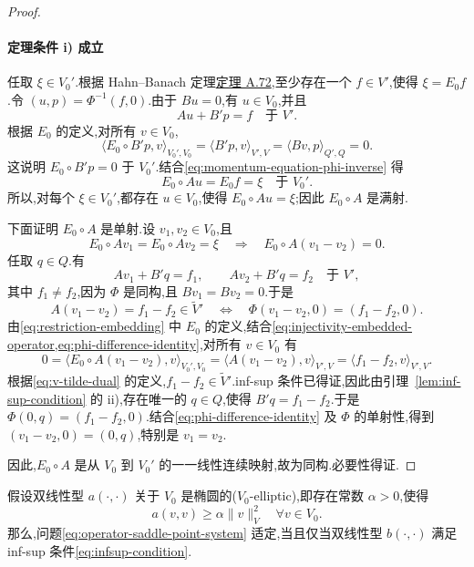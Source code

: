 \begin{proof}
\paragraph{定理条件 i) 成立}
任取 $\xi\in V_0'$.根据 Hahn--Banach 定理\hyperref[thm:appendix-a-72]{定理 A.72},至少存在一个 $f\in V'$,使得 $\xi=E_0f$.令 $(u,p)=\Phi^{-1}(f,0)$.由于 $Bu=0$,有 $u\in V_0$,并且
\begin{equation}\label{eq:momentum-equation-phi-inverse}
  Au+B'p=f\quad\text{于 }V'.
\end{equation}
根据 $E_0$ 的定义,对所有 $v\in V_0$,
\[
  \langle E_0\circ B'p,v\rangle_{V_0',V_0}
    =\langle B'p,v\rangle_{V',V}
    =\langle Bv,p\rangle_{Q',Q}=0.
\]
这说明 $E_0\circ B'p=0$ 于 $V_0'$.结合\cref{eq:momentum-equation-phi-inverse} 得
\[
  E_0\circ Au=E_0f=\xi\quad\text{于 }V_0'.
\]
所以,对每个 $\xi\in V_0'$,都存在 $u\in V_0$,使得 $E_0\circ Au=\xi$;因此 $E_0\circ A$ 是满射.

下面证明 $E_0\circ A$ 是单射.设 $v_1,v_2\in V_0$,且
\begin{equation}\label{eq:injectivity-embedded-operator}
  E_0\circ Av_1=E_0\circ Av_2=\xi
  \quad\Longrightarrow\quad
  E_0\circ A(v_1-v_2)=0.
\end{equation}
任取 $q\in Q$.有
\[
  Av_1+B'q=f_1,\qquad Av_2+B'q=f_2\quad\text{于 }V',
\]
其中 $f_1\ne f_2$,因为 $\Phi$ 是同构,且 $Bv_1=Bv_2=0$.于是
\begin{equation}\label{eq:phi-difference-identity}
  A(v_1-v_2)=f_1-f_2\in\widetilde{V}'
  \quad\Longleftrightarrow\quad
  \Phi(v_1-v_2,0)=(f_1-f_2,0).
\end{equation}
由\cref{eq:restriction-embedding} 中 $E_0$ 的定义,结合\cref{eq:injectivity-embedded-operator,eq:phi-difference-identity},对所有 $v\in V_0$ 有
\[
  0=\langle E_0\circ A(v_1-v_2),v\rangle_{V_0',V_0}
   =\langle A(v_1-v_2),v\rangle_{V',V}
   =\langle f_1-f_2,v\rangle_{V',V}.
\]
根据\cref{eq:v-tilde-dual} 的定义,$f_1-f_2\in\widetilde{V}'$.inf-sup 条件已得证,因此由引理~\ref{lem:inf-sup-condition} 的 ii),存在唯一的 $q\in Q$,使得 $B'q=f_1-f_2$.于是 $\Phi(0,q)=(f_1-f_2,0)$.结合\cref{eq:phi-difference-identity} 及 $\Phi$ 的单射性,得到 $(v_1-v_2,0)=(0,q)$,特别是 $v_1=v_2$.

因此,$E_0\circ A$ 是从 $V_0$ 到 $V_0'$ 的一一线性连续映射,故为同构.必要性得证.
\end{proof}

\begin{lemma}\label{lem:sufficient-condition-ellipticity}
假设双线性型 $a(\cdot,\cdot)$ 关于 $V_0$ 是椭圆的($V_0$-elliptic),即存在常数 $\alpha>0$,使得
\[
  a(v,v)\ge\alpha\|v\|_V^2\quad\forall v\in V_0.
\]
那么,问题\cref{eq:operator-saddle-point-system} 适定,当且仅当双线性型 $b(\cdot,\cdot)$ 满足 inf-sup 条件\cref{eq:infsup-condition}.
\end{lemma}

